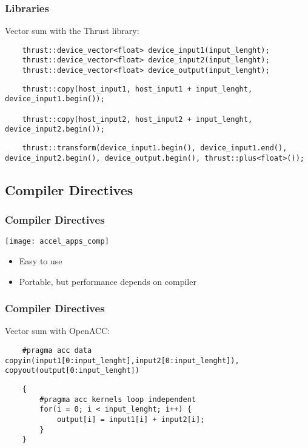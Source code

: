 \documentclass[10pt, compress]{beamer}
\begin{document}
\begin{frame}[fragile]
    \frametitle{Libraries}
    Vector sum with the \alert{Thrust} library:
    \begin{lstlisting}
    thrust::device_vector<float> device_input1(input_lenght);
    thrust::device_vector<float> device_input2(input_lenght);
    thrust::device_vector<float> device_output(input_lenght);
    \end{lstlisting}

    \begin{lstlisting}
    thrust::copy(host_input1, host_input1 + input_lenght, device_input1.begin());

    thrust::copy(host_input2, host_input2 + input_lenght, device_input2.begin());
    \end{lstlisting}

    \begin{lstlisting}
    thrust::transform(device_input1.begin(), device_input1.end(), device_input2.begin(), device_output.begin(), thrust::plus<float>());
    \end{lstlisting}
\end{frame}

\subsection{Compiler Directives}

\begin{frame}
    \frametitle{Compiler Directives}
    \begin{center}
        \texttt{[image: accel\_apps\_comp]}
    \end{center}


    \begin{itemize}
        \item Easy to use

        \item Portable, but performance depends on compiler
    \end{itemize}
\end{frame}

\begin{frame}[fragile]
    \frametitle{Compiler Directives}
    Vector sum with \alert{OpenACC}:
    \begin{lstlisting}
    #pragma acc data copyin(input1[0:input_lenght],input2[0:input_lenght]), copyout(output[0:input_lenght])
    \end{lstlisting}

    \begin{lstlisting}
    {
        #pragma acc kernels loop independent
        for(i = 0; i < input_lenght; i++) {
            output[i] = input1[i] + input2[i];
        }
    }
    \end{lstlisting}
\end{frame}
\end{document}
